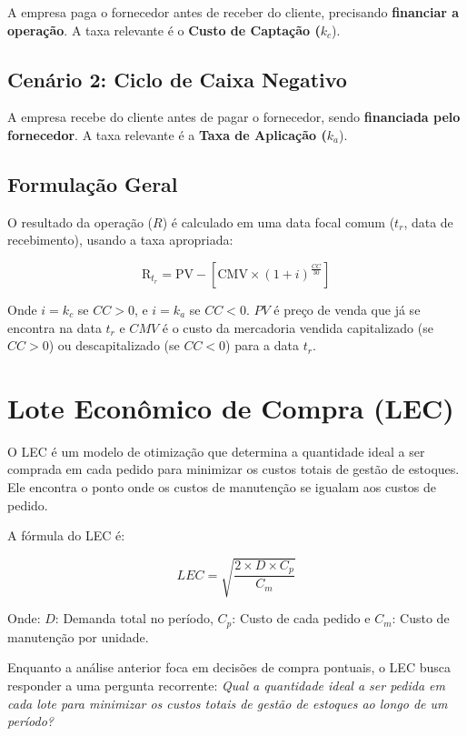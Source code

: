 \documentclass[
  a4paper,
]{book}
\begin{document}
A empresa paga o fornecedor antes de receber do cliente, precisando
\textbf{financiar a operação}. A taxa relevante é o \textbf{Custo de
Captação (}\(k_c\)).

\subsection{Cenário 2: Ciclo de Caixa
Negativo}\label{cenuxe1rio-2-ciclo-de-caixa-negativo}

A empresa recebe do cliente antes de pagar o fornecedor, sendo
\textbf{financiada pelo fornecedor}. A taxa relevante é a \textbf{Taxa
de Aplicação (}\(k_a\)).

\subsection{Formulação Geral}\label{formulauxe7uxe3o-geral}

O resultado da operação (\(R\)) é calculado em uma data focal comum
(\(t_r\), data de recebimento), usando a taxa apropriada:

\[
\text{R}_{t_r} = \text{PV} - \left[ \text{CMV} \times (1 + i)^{\frac{CC}{30}} \right]
\]

Onde \(i = k_c\) se \(CC > 0\), e \(i = k_a\) se \(CC < 0\). \(PV\) é
preço de venda que já se encontra na data \(t_r\) e \(CMV\) é o custo da
mercadoria vendida capitalizado (se \(CC > 0\)) ou descapitalizado (se
\(CC < 0\)) para a data \(t_r\).

\section{Lote Econômico de Compra
(LEC)}\label{lote-econuxf4mico-de-compra-lec}

O LEC é um modelo de otimização que determina a quantidade ideal a ser
comprada em cada pedido para minimizar os custos totais de gestão de
estoques. Ele encontra o ponto onde os custos de manutenção se igualam
aos custos de pedido.

A fórmula do LEC é:

\[
LEC = \sqrt{\frac{2 \times D \times C_p}{C_m}}
\]

Onde: \(D\): Demanda total no período, \(C_p\): Custo de cada pedido e
\(C_m\): Custo de manutenção por unidade.

Enquanto a análise anterior foca em decisões de compra pontuais, o LEC
busca responder a uma pergunta recorrente: \emph{Qual a quantidade ideal
a ser pedida em cada lote para minimizar os custos totais de gestão de
estoques ao longo de um período?}
\end{document}
